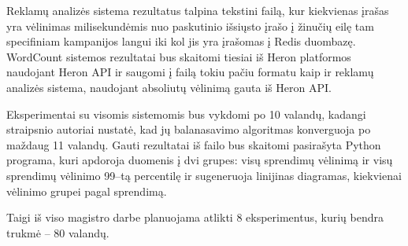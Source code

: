 \documentclass{VUMIFPSbakalaurinis}
\begin{document}
Reklamų analizės sistema rezultatus talpina tekstini failą, kur kiekvienas įrašas yra vėlinimas milisekundėmis nuo paskutinio išsiųsto įrašo į žinučių eilę tam specifiniam kampanijos langui iki kol jis yra įrašomas į Redis duombazę. WordCount sistemos rezultatai bus skaitomi tiesiai iš Heron platformos naudojant Heron API ir saugomi į failą tokiu pačiu formatu kaip ir reklamų analizės sistema, naudojant absoliutų vėlinimą gauta iš Heron API. 

Eksperimentai su visomis sistemomis bus vykdomi po 10 valandų, kadangi \cite{vaquero2018autotuning} straipsnio autoriai nustatė, kad jų balanasavimo algoritmas konverguoja po maždaug 11 valandų. 
Gauti rezultatai iš failo bus skaitomi pasirašyta Python programa, kuri apdoroja duomenis į dvi grupes: visų sprendimų vėlinimą ir visų sprendimų vėlinimo 99–tą percentilę ir sugeneruoja linijinas diagramas, kiekvienai vėlinimo grupei pagal sprendimą.

Taigi iš viso magistro darbe planuojama atlikti 8 eksperimentus, kurių bendra trukmė – 80 valandų.



\printbibliography[heading=bibintoc] 
\end{document}
